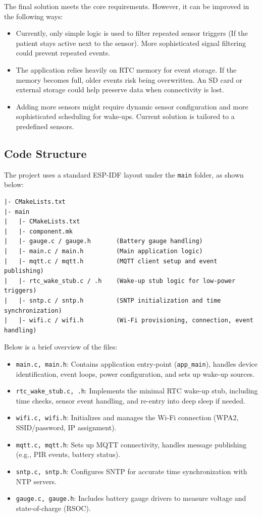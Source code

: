 \documentclass[A4,10pt]{article}
\begin{document}
The final solution meets the core requirements. However, it can be improved in the following ways:
\begin{itemize}
    \item Currently, only simple logic is used to filter repeated sensor triggers (If the patient stays active next to the sensor). More sophisticated signal filtering could prevent repeated events.
    \item The application relies heavily on RTC memory for event storage. If the memory becomes full, older events risk being overwritten. An SD card or external storage could help preserve data when connectivity is lost.
    \item Adding more sensors might require dynamic sensor configuration and more sophisticated scheduling for wake-ups. Current solution is tailored to a predefined sensors.
\end{itemize}

\subsection{Code Structure} The project uses a standard ESP-IDF layout under the \texttt{main} folder, as shown below:
\begin{verbatim}
|- CMakeLists.txt
|- main
|   |- CMakeLists.txt
|   |- component.mk
|   |- gauge.c / gauge.h       (Battery gauge handling)
|   |- main.c / main.h         (Main application logic)
|   |- mqtt.c / mqtt.h         (MQTT client setup and event publishing)
|   |- rtc_wake_stub.c / .h    (Wake-up stub logic for low-power triggers)
|   |- sntp.c / sntp.h         (SNTP initialization and time synchronization)
|   |- wifi.c / wifi.h         (Wi-Fi provisioning, connection, event handling)
\end{verbatim}

\noindent Below is a brief overview of the files:
\begin{itemize}
    \item \texttt{main.c, main.h}: Contains application entry-point (\texttt{app\_main}), handles device identification, event loops, power configuration, and sets up wake-up sources.
    \item \texttt{rtc\_wake\_stub.c, .h}: Implements the minimal RTC wake-up stub, including time checks, sensor event handling, and re-entry into deep sleep if needed.
    \item \texttt{wifi.c, wifi.h}: Initializes and manages the Wi-Fi connection (WPA2, SSID/password, IP assignment).
    \item \texttt{mqtt.c, mqtt.h}: Sets up MQTT connectivity, handles message publishing (e.g., PIR events, battery status).
    \item \texttt{sntp.c, sntp.h}: Configures SNTP for accurate time synchronization with NTP servers.
    \item \texttt{gauge.c, gauge.h}: Includes battery gauge drivers to measure voltage and state-of-charge (RSOC).
\end{itemize}
\end{document}
